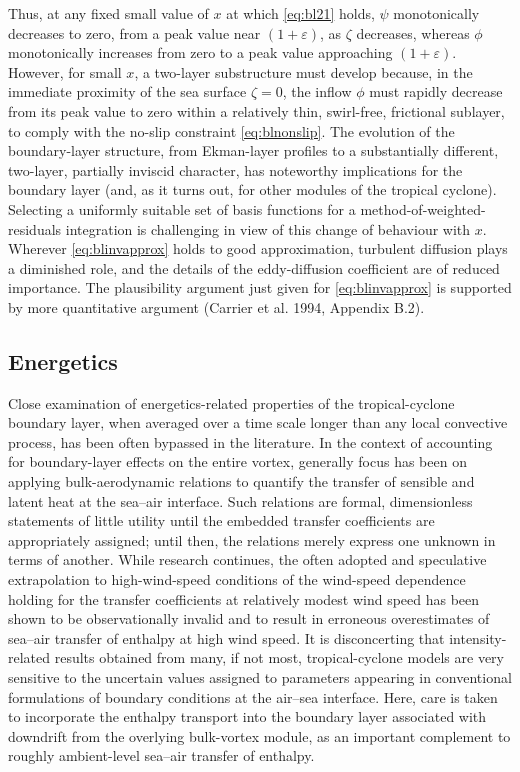 \documentclass[preprint, prX]{revtex4}
\begin{document}
Thus, at any fixed small value of $x$ at which \eqref{eq:bl21} holds, $\psi$ monotonically decreases to zero, from a peak value near $(1 + \varepsilon)$, as $\zeta$ decreases, whereas $\phi$ monotonically increases from zero to a peak value approaching $(1 + \varepsilon)$. However, for small $x$, a two-layer substructure must develop because, in the immediate proximity of the sea surface $\zeta = 0$, the inflow $\phi$ must rapidly decrease from its peak value to zero within a relatively thin, swirl-free, frictional sublayer, to comply with the no-slip constraint \eqref{eq:blnonslip}. The evolution of the boundary-layer structure, from Ekman-layer profiles to a substantially different, two-layer, partially inviscid character, has noteworthy implications for the boundary layer (and, as it turns out, for other modules of the tropical cyclone). Selecting a uniformly suitable set of basis functions for a method-of-weighted-residuals integration is challenging in view of this change of behaviour with $x$. Wherever \eqref{eq:blinvapprox} holds to good approximation, turbulent diffusion plays a diminished role, and the details of the eddy-diffusion coefficient are of reduced importance. The plausibility argument just given for \eqref{eq:blinvapprox} is supported by more quantitative argument (Carrier et al. 1994, Appendix B.2).

\subsection{Energetics}

Close examination of energetics-related properties of the tropical-cyclone boundary layer, when averaged over a time scale longer than any local convective process, has been often bypassed in the literature. In the context of accounting for boundary-layer effects on the entire vortex, generally focus has been on applying bulk-aerodynamic relations to quantify the transfer of sensible and latent heat at the sea–air interface. Such relations are formal, dimensionless statements of little utility until the embedded transfer coefficients are appropriately assigned; until then, the relations merely express one unknown in terms of another. While research continues, the often adopted and speculative extrapolation to high-wind-speed conditions of the wind-speed dependence holding for the transfer coefficients at relatively modest wind speed has been shown to be observationally invalid and to result in erroneous overestimates of sea–air transfer of enthalpy at high wind speed. It is disconcerting that intensity-related results obtained from many, if not most, tropical-cyclone models are very sensitive to the uncertain values assigned to parameters appearing in conventional formulations of boundary conditions at the air–sea interface. Here, care is taken to incorporate the enthalpy transport into the boundary layer associated with downdrift from the overlying bulk-vortex module, as an important complement to roughly ambient-level sea–air transfer of enthalpy.
\end{document}
